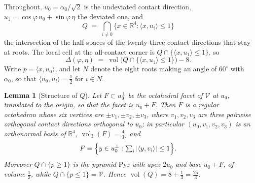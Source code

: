 \documentclass[11pt,reqno]{amsart}
\renewcommand{\_}{\origunderscore\allowbreak}
\numberwithin{equation}{section}
\theoremstyle{plain}
\newtheorem{lem}[thm]{Lemma}
\theoremstyle{definition}
\theoremstyle{remark}
\newcommand{\VCell}{\mathcal{V}}             %
\newcommand{\tilt}{\varphi}                  %
\newcommand{\dev}{\eta}                      %
\newcommand{\defect}{\Delta}                 %
\newcommand{\base}{u}                        %
\DeclareMathOperator{\vol}{vol}
\begin{document}
Throughout, $\base_0=\alpha_0/\sqrt2$ is the undeviated contact direction,
$\base_1=\cos\tilt\,\base_0+\sin\tilt\,\dev$ the deviated one, and
\[
  Q \;=\; \bigcap_{i\ne0}\bigl\{x\in\mathbb{R}^4 :
          \langle x,\base_i\rangle\le1\bigr\}
\]
the intersection of the half-spaces of the twenty-three contact directions
that stay at roots. The local cell at the all-contact corner is
$Q\cap\{\langle x,\base_1\rangle\le1\}$, so
\begin{equation}\label{eq:defect-is-vol}
  \defect(\tilt,\dev)
  \;=\;\vol\bigl(Q\cap\{\langle x,\base_1\rangle\le1\}\bigr)-8 .
\end{equation}
Write $p=\langle x,\base_0\rangle$, and let $N$ denote the eight roots
making an angle of $60^\circ$ with $\alpha_0$, so that
$\langle\base_0,\base_i\rangle=\tfrac12$ for $i\in N$.

\begin{lem}[Structure of $Q$]\label{lem:Q-structure}
Let $F\subset\base_0^{\perp}$ be the octahedral facet of $\VCell$ at
$\base_0$, translated to the origin, so that the facet is $\base_0+F$.
Then $F$ is a regular octahedron whose six vertices are $\pm v_1,\pm
v_2,\pm v_3$, where $v_1,v_2,v_3$ are three pairwise orthogonal contact
directions orthogonal to $\base_0$; in particular
$(\base_0,v_1,v_2,v_3)$ is an orthonormal basis of $\mathbb{R}^4$,
$\vol_3(F)=\tfrac43$, and
\[
  F=\Bigl\{y\in\base_0^{\perp} : \textstyle\sum_{i}|\langle y,v_i\rangle|\le1\Bigr\} .
\]
Moreover $Q\cap\{p\ge1\}$ is the pyramid $\mathrm{Pyr}$ with apex
$2\base_0$ and base $\base_0+F$, of volume $\tfrac13$, while
$Q\cap\{p\le1\}=\VCell$. Hence $\vol(Q)=8+\tfrac13=\tfrac{25}{3}$.
\end{lem}
\end{document}
